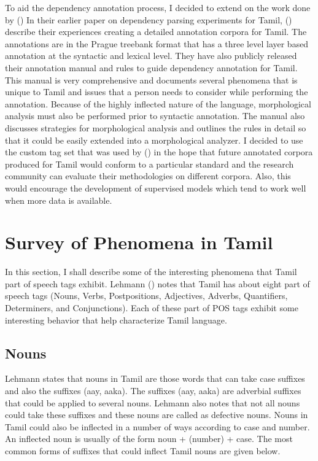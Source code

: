 \documentclass[11pt,letterpaper]{article}
\begin{document}
To aid the dependency annotation process, I decided to extend on the work done by (\cite{ramasamy2011tamil})
In their earlier paper on dependency parsing experiments for Tamil, (\cite{ramasamy2011tamil}) describe their experiences creating a detailed 
annotation corpora for Tamil. The annotations are in the Prague treebank format that has a three level layer based annotation at the syntactic and lexical level. 
They have also publicly released their annotation manual and rules to guide dependency annotation for Tamil. This manual is very comprehensive and documents several phenomena that is unique to Tamil
and issues that a person needs to consider while performing the annotation. Because of the highly inflected nature of the language,
morphological analysis must also be performed prior to syntactic annotation. The manual also discusses strategies for morphological
analysis and outlines the rules in detail so that it could be easily extended into a morphological analyzer. I decided to use the custom tag set 
that was used by (\cite{ramReport}) in the hope that future annotated corpora produced for Tamil would conform to a particular standard
and the research community can evaluate their methodologies on different corpora. Also, this would encourage the development
of supervised models which tend to work well when more data is available. 

\section{Survey of Phenomena in Tamil}

In this section, I shall describe some of the interesting phenomena that Tamil part of speech tags exhibit. Lehmann (\cite{lehmann1989grammar})
notes that Tamil has about eight part of speech tags (Nouns, Verbs, Postpositions, Adjectives, Adverbs, Quantifiers, Determiners,
and Conjunctions). Each of these part of POS tags exhibit some interesting behavior that help characterize Tamil language. 

\subsection{Nouns}

Lehmann states that nouns in Tamil are those words that can take case suffixes and also the suffixes (aay, aaka). The suffixes 
(aay, aaka) are adverbial suffixes that could be applied to several nouns. Lehmann also notes that not all nouns could take
these suffixes and these nouns are called as defective nouns. Nouns in Tamil could also be inflected in a number of ways according to
case and number. An inflected noun is usually of the form noun + (number) + case. The most common forms of suffixes that could inflect Tamil
nouns are given below.
\end{document}
